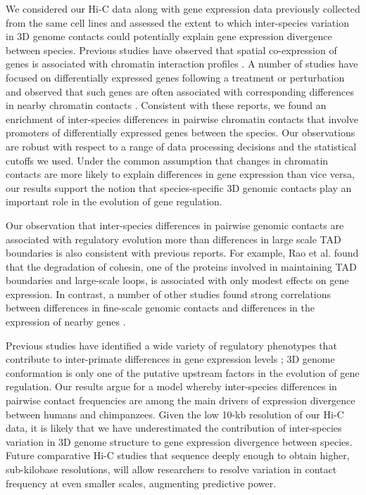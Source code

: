 We considered our Hi-C data along with gene expression data previously collected from the same cell lines \cite{Pavlovic.2018} and assessed the extent to which inter-species variation in 3D genome contacts could potentially explain gene expression divergence between species. Previous studies have observed that spatial co-expression of genes is associated with chromatin interaction profiles \cite{Babaei.2015, Dong.2010, Homouz.2013, Schoenfelder.2010, Duren.2017}. A number of studies have focused on differentially expressed genes following a treatment or perturbation and observed that such genes are often associated with corresponding differences in nearby chromatin contacts \cite{Dily.2014, Chen.2017}. Consistent with these reports, we found an enrichment of inter-species differences in pairwise chromatin contacts that involve promoters of differentially expressed genes between the species. Our observations are robust with respect to a range of data processing decisions and the statistical cutoffs we used. Under the common assumption that changes in chromatin contacts are more likely to explain differences in gene expression than vice versa, our results support the notion that species-specific 3D genomic contacts play an important role in the evolution of gene regulation.

Our observation that inter-species differences in pairwise genomic contacts are associated with regulatory evolution more than differences in large scale TAD boundaries is also consistent with previous reports. For example, Rao et al. \cite{Rao.2017} found that the degradation of cohesin, one of the proteins involved in maintaining TAD boundaries and large-scale loops, is associated with only modest effects on gene expression. In contrast, a number of other studies found strong correlations between differences in fine-scale genomic contacts and differences in the expression of nearby genes \cite{Rao.2014, Kagey.2010}.

Previous studies have identified a wide variety of regulatory phenotypes that contribute to inter-primate differences in gene expression levels \cite{Warner.2009, Loisel.2006, Pollard.2006, Pai.2011, Zhou.2014, Blekhman.2009, Cain.2011}; 3D genome conformation is only one of the putative upstream factors in the evolution of gene regulation. Our results argue for a model whereby inter-species differences in pairwise contact frequencies are among the main drivers of expression divergence between humans and chimpanzees. Given the low 10-kb resolution of our Hi-C data, it is likely that we have underestimated the contribution of inter-species variation in 3D genome structure to gene expression divergence between species. Future comparative Hi-C studies that sequence deeply enough to obtain higher, sub-kilobase resolutions, will allow researchers to resolve variation in contact frequency at even smaller scales, augmenting predictive power.

